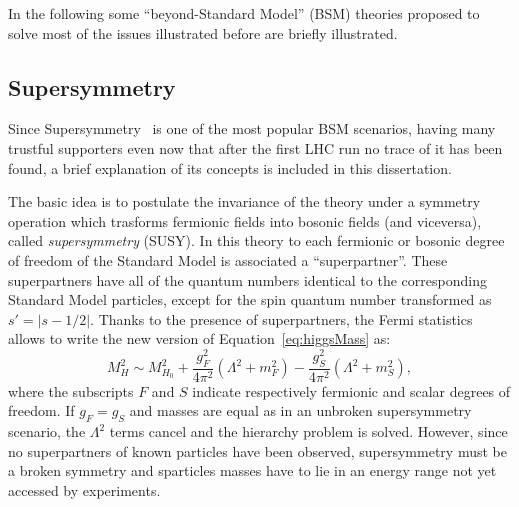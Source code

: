 In the following some ``beyond-Standard Model'' (BSM) theories
proposed to solve most of the issues illustrated
before are briefly illustrated.

\subsection{Supersymmetry}\label{sec:susy}

Since Supersymmetry~\cite{Dawson:1996cq} is one of the most popular
BSM scenarios, having many trustful supporters even
now that after the first LHC run no trace of it
has been found, a brief explanation of its concepts
is included in this dissertation.

The basic idea is to postulate the invariance 
of the theory under a symmetry operation which 
trasforms fermionic fields into bosonic fields 
(and viceversa), called \textit{supersymmetry} (SUSY). 
In this theory to each fermionic or bosonic 
degree of freedom of the Standard Model is associated a 
``superpartner''. These superpartners have all 
of the quantum numbers identical to the corresponding 
Standard Model particles, except for the spin quantum number 
transformed as $s' = |s - 1/2|$. Thanks to the 
presence of superpartners, the Fermi statistics 
allows to write the new version of Equation~\ref{eq:higgsMass} as:
\begin{equation}
\label{eq:higgsMassSUSY}
M_{H}^{2} \sim M_{H_{0}}^{2} + \dfrac{g_{F}^{2}}{4\pi^{2}} (\Lambda^{2} + m_{F}^{2} ) - \dfrac{g_{S}^{2}}{4\pi^{2}} (\Lambda^{2} + m_{S}^{2} ),
\end{equation} 
where the subscripts $F$ and $S$ indicate respectively 
fermionic and scalar degrees of freedom. If $g_{F} = g_{S}$ 
and masses are equal as in an unbroken supersymmetry scenario, 
the $\Lambda^2$ terms cancel and the hierarchy problem is solved. 
However, since no superpartners of known particles 
have been observed,  supersymmetry must be a broken 
symmetry and sparticles masses have to lie in an 
energy range not yet accessed by experiments.

